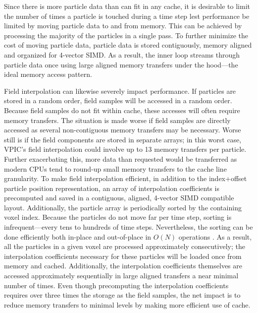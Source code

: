 \documentclass[journal,twoside]{IEEEtran}
\begin{document}
Since there is more particle data than can fit in any cache, it is
desirable to limit the number of times a particle is touched during a
time step lest performance be limited by moving particle data to and
from memory.  This can be achieved by processing the majority of the
particles in a single pass.  To further minimize the cost of moving
particle data, particle data is stored contiguously, memory aligned
and organized for 4-vector SIMD.  As a result, the inner loop streams
through particle data once using large aligned memory transfers under
the hood---the ideal memory access pattern.

Field interpolation can likewise severely impact performance.  If
particles are stored in a random order, field samples will be accessed
in a random order.  Because field samples do not fit within cache,
these accesses will often require memory transfers.  The situation is
made worse if field samples are directly accessed as several
non-contiguous memory transfers may be necessary.  Worse still is if
the field components are stored in separate arrays; in this worst
case, VPIC's field interpolation could involve up to 13 memory
transfers per particle.  Further exacerbating this, more data than
requested would be transferred as modern CPUs tend to round-up small
memory transfers to the cache line granularity.  To make field
interpolation efficient, in addition to the index+offset particle
position representation, an array of interpolation coefficients is
precomputed and saved in a contiguous, aligned, 4-vector SIMD
compatible layout.  Additionally, the particle array is periodically
sorted by the containing voxel index.  Because the particles do not
move far per time step, sorting is infrequent---every tens to hundreds
of time steps.  Nevertheless, the sorting can be done efficiently both
in-place and out-of-place in $O(N)$ operations \cite{Bowers_2001}.  As
a result, all the particles in a given voxel are processed
approximately consecutively; the interpolation coefficients necessary
for these particles will be loaded once from memory and cached.
Additionally, the interpolation coefficients themselves are accessed
approximately sequentially in large aligned transfers a near minimal
number of times.  Even though precomputing the interpolation
coefficients requires over three times the storage as the field
samples, the net impact is to reduce memory transfers to minimal
levels by making more efficient use of cache.

\end{document}
